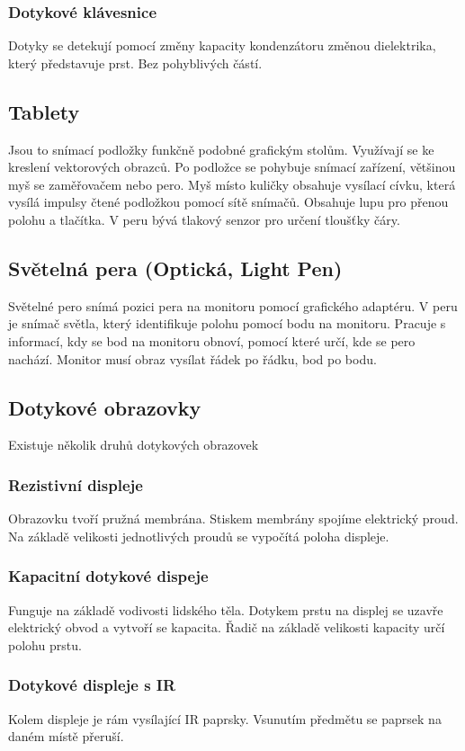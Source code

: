 \subsubsection{Dotykové klávesnice}
Dotyky se detekují pomocí změny kapacity kondenzátoru změnou dielektrika, který představuje prst.
Bez pohyblivých částí.
\subsection{Tablety}
Jsou to snímací podložky funkčně podobné grafickým stolům.
Využívají se ke kreslení vektorových obrazců.
Po podložce se pohybuje snímací zařízení, většinou myš se zaměřovačem nebo pero.
Myš místo kuličky obsahuje vysílací cívku, která vysílá impulsy čtené podložkou pomocí sítě snímačů.
Obsahuje lupu pro přenou polohu a tlačítka.
V peru bývá tlakový senzor pro určení tloušťky čáry.
\subsection{Světelná pera (Optická, Light Pen)}
Světelné pero snímá pozici pera na monitoru pomocí grafického adaptéru.
V peru je snímač světla, který identifikuje polohu pomocí bodu na monitoru.
Pracuje s informací, kdy se bod na monitoru obnoví, pomocí které určí, kde se pero nachází.
Monitor musí obraz vysílat řádek po řádku, bod po bodu.
\subsection{Dotykové obrazovky}
Existuje několik druhů dotykových obrazovek
\subsubsection{Rezistivní displeje}
Obrazovku tvoří pružná membrána.
Stiskem membrány spojíme elektrický proud.
Na základě velikosti jednotlivých proudů se vypočítá poloha displeje.
\subsubsection{Kapacitní dotykové dispeje}
Funguje na základě vodivosti lidského těla.
Dotykem prstu na displej se uzavře elektrický obvod a vytvoří se kapacita.
Řadič na základě velikosti kapacity určí polohu prstu.
\subsubsection{Dotykové displeje s IR}
Kolem displeje je rám vysílající IR paprsky.
Vsunutím předmětu se paprsek na daném místě přeruší.
